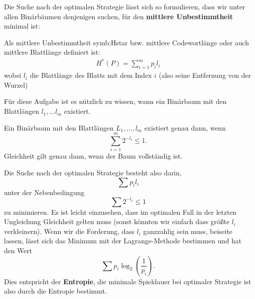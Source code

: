 Die Suche nach der
optimalen Strategie lässt sich so formulieren, dass wir unter
allen Binärbäumen denjenigen suchen, für den \textbf{mittlere Unbestimmtheit} minimal ist:

\begin{definition}\label{def:mittlere_unbestimmtheit}
Als mittlere Unbestimmtheit \gls{symb:Hstar} bzw. mittlere Codewortlänge oder auch mittlere Blattlänge definiert ist:
\begin{align}
H^*(P) = \sum_{i=1}^{m} p_i l_i
\end{align}
wobei $l_i$ die Blattlänge des Blatts mit dem Index $i$ (also seine Entfernung von der Wurzel)
\end{definition}

Für diese Aufgabe
ist es nützlich zu wissen, wann ein Binärbaum mit den 
Blattlängen $l_1,\dots l_m$ existiert.
\begin{satz}
Ein Binärbaum mit den Blattlängen $L_1,\dots,l_m$ existiert genau dann,
wenn 
\[\sum_{i=1}^m2^{-l_i}\le 1.\]
Gleichheit gilt genau dann, wenn der Baum vollständig ist.
\end{satz}

Die Suche nach der optimalen Strategie besteht also darin,
\[\sum p_il_i\]
unter der Nebenbedingung
\[\sum 2^{-l_i}\le 1\]
zu minimieren. Es ist leicht einzusehen, dass im optimalen Fall in der
letzten Ungleichung Gleichheit gelten muss (sonst könnten wir einfach 
dass größte $l_i$ verkleinern).
Wenn wir die Forderung, dass $l_i$ ganzzahlig sein muss, beiseite lassen,
lässt sich das Minimum mit der Lagrange-Methode bestimmen  und hat den Wert
\[\sum p_i\log_2(\frac{1}{p_i}).\]
Dies entspricht der \textbf{Entropie}, die minimale Spieldauer bei optimaler Strategie ist also durch die Entropie bestimmt.\\

